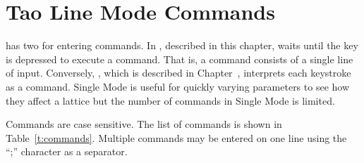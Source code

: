 \chapter{Tao Line Mode Commands}
\label{c:command}

\tao has two  for entering commands. In ,
described in this chapter, \tao waits until the  key is
depressed to execute a command. That is, a command consists of a
single line of input. Conversely, , which is described
in Chapter~, interprets each keystroke as a
command. Single Mode is useful for quickly varying parameters to see
how they affect a lattice but the number of commands in Single Mode is
limited.

Commands are case sensitive. The list of commands is shown in
Table~\ref{t:commands}. Multiple commands
may be entered on one line using the ``;'' character as a separator.


\begin{table}[h]
\caption{Table of \tao commands.}
\label{t:commands}
\end{table}

